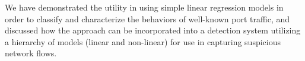 We have demonstrated the utility in using simple linear regression models in order to classify and characterize the behaviors of well-known port traffic, and discussed how the approach can be incorporated into a detection system utilizing a hierarchy of models (linear and non-linear) for use in capturing suspicious network flows.